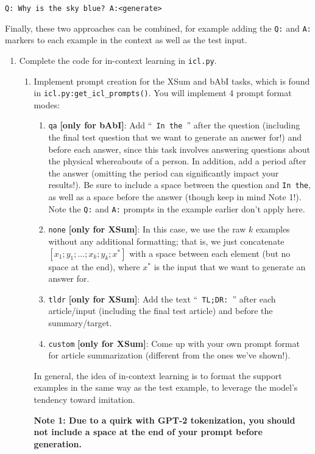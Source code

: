 \documentclass[12pt]{article}
\begin{document}
\texttt{Q: Why is the sky blue? A:\textless generate\textgreater}

Finally, these two approaches can be combined, for example adding the \texttt{Q:} and \texttt{A:} markers to each example in the context as well as the test input.

\begin{enumerate}
    \item Complete the code for in-context learning in \texttt{icl.py}.
    \begin{enumerate}
        \item Implement prompt creation for the XSum and bAbI tasks, which is found in \texttt{icl.py:get\_icl\_prompts()}. You will implement 4 prompt format modes:
        \begin{enumerate}
            \item \texttt{qa} \textbf{[only for bAbI]}: Add ``\texttt{ In the }'' after the question (including the final test question that we want to generate an answer for!) and before each answer, since this task involves answering questions about the physical whereabouts of a person. In addition, add a period after the answer (omitting the period can significantly impact your results!). Be sure to include a space between the question and \texttt{In the}, as well as a space before the answer (though keep in mind Note 1!). Note the  \texttt{Q:} and \texttt{A:} prompts in the example earlier don't apply here.
            \item \texttt{none} \textbf{[only for XSum]}: In this case, we use the raw $k$ examples without any additional formatting; that is, we just concatenate $[x_1; y_1; ... ; \allowbreak x_k; y_k; x^*]$ with a space between each element (but no space at the end), where $x^*$ is the input that we want to generate an answer for.
            \item \texttt{tldr} \textbf{[only for XSum]}: Add the text ``\texttt{ TL;DR: }'' after each article/input (including the final test article) and before the summary/target.
            \item \texttt{custom} \textbf{[only for XSum]}: Come up with your own prompt format for article summarization (different from the ones we've shown!).
        \end{enumerate}
        In general, the idea of in-context learning is to format the support examples in the same way as the test example, to leverage the model's tendency toward imitation.

        \textbf{Note 1: Due to a quirk with GPT-2 tokenization, you should not include a space at the end of your prompt before generation.}
        

\end{enumerate}
\end{enumerate}
\end{document}
